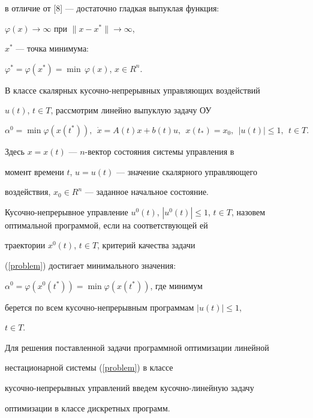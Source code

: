 в отличие от [8] --- достаточно гладкая выпуклая функция:


$\varphi(x)\rightarrow\infty$ при $\|x-x^*\|\rightarrow\infty$,


$x^*$ --- точка минимума:


$\varphi^*=\varphi(x^*)=\min\,\varphi(x)$, $x\in R^n$.





В классе скалярных кусочно-непрерывных управляющих воздействий


$u(t)$, $t\in T$, рассмотрим линейно выпуклую задачу ОУ


\begin{equation}\label{problem}


\alpha^0=\min\varphi(x(t^*)),\ \ \Dot{x}=A(t)x+b(t)u,


\ \ x(t_*)=x_0,\ \ |u(t)|\leq1,\ \ t\in T.


\end{equation}


Здесь $x=x(t)$ --- $n$-вектор состояния системы управления в


момент времени $t$, $u=u(t)$ --- значение скалярного управляющего


воздействия, $x_0\in R^n$ --- заданное начальное состояние.





Кусочно-непрерывное управление $u^0(t)$, $|u^0(t)|\leq1$, $t\in


T$, назовем оптимальной программой, если на соответствующей ей


траектории $x^0(t)$, $t\in T$, критерий качества задачи


(\ref{problem}) достигает минимального значения:


$\alpha^0=\varphi(x^0(t^*))=\min\varphi(x(t^*))$, где минимум


берется по всем кусочно-непрерывным программам $|u(t)|\leq 1$,


$t\in T$.





Для решения поставленной задачи программной оптимизации линейной


нестационарной системы (\ref{problem}) в классе


кусочно-непрерывных управлений введем кусочно-линейную задачу


оптимизации в классе дискретных программ.





